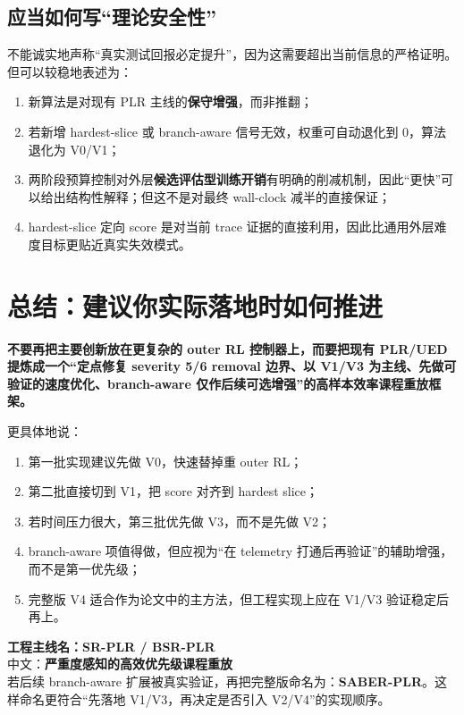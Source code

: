 \documentclass[11pt,a4paper]{ctexart}
\begin{document}
\subsection{应当如何写“理论安全性”}
不能诚实地声称“真实测试回报必定提升”，因为这需要超出当前信息的严格证明。但可以较稳地表述为：
\begin{enumerate}[leftmargin=2.2em,itemsep=0.25em]
    \item 新算法是对现有 PLR 主线的\textbf{保守增强}，而非推翻；
    \item 若新增 hardest-slice 或 branch-aware 信号无效，权重可自动退化到 0，算法退化为 V0/V1；
    \item 两阶段预算控制对外层\textbf{候选评估型训练开销}有明确的削减机制，因此“更快”可以给出结构性解释；但这不是对最终 wall-clock 减半的直接保证；
    \item hardest-slice 定向 score 是对当前 trace 证据的直接利用，因此比通用外层难度目标更贴近真实失效模式。
\end{enumerate}

\section{总结：建议你实际落地时如何推进}
\begin{tcolorbox}[colback=blue!3,colframe=MidnightBlue,title=一句话总结]
\textbf{不要再把主要创新放在更复杂的 outer RL 控制器上，而要把现有 PLR/UED 提炼成一个“定点修复 severity 5/6 removal 边界、以 V1/V3 为主线、先做可验证的速度优化、branch-aware 仅作后续可选增强”的高样本效率课程重放框架。}
\end{tcolorbox}

更具体地说：
\begin{enumerate}[leftmargin=2.2em,itemsep=0.3em]
    \item 第一批实现建议先做 V0，快速替掉重 outer RL；
    \item 第二批直接切到 V1，把 score 对齐到 hardest slice；
    \item 若时间压力很大，第三批优先做 V3，而不是先做 V2；
    \item branch-aware 项值得做，但应视为“在 telemetry 打通后再验证”的辅助增强，而不是第一优先级；
    \item 完整版 V4 适合作为论文中的主方法，但工程实现上应在 V1/V3 验证稳定后再上。
\end{enumerate}

\vspace{0.8em}
\begin{tcolorbox}[colback=green!3,colframe=OliveGreen,title=推荐命名]
\textbf{工程主线名：SR-PLR / BSR-PLR}\\
中文：\textbf{严重度感知的高效优先级课程重放}\\
若后续 branch-aware 扩展被真实验证，再把完整版命名为：\textbf{SABER-PLR}。这样命名更符合“先落地 V1/V3，再决定是否引入 V2/V4”的实现顺序。
\end{tcolorbox}
\end{document}

